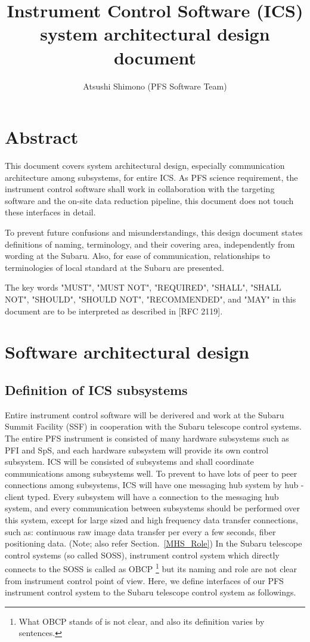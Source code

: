 \documentclass[a4paper,notitlepage]{article}
\title{Instrument Control Software (ICS) system architectural design document}
\author{Atsushi Shimono (PFS Software Team)}
\begin{document}
\ICDITSIDS{}  %
\ICDApproval{}
\ICDSuperApproval{}
\ICDReference{}
\ICDAttachment{}
\icdhead

\section{Abstract}

This document covers system architectural design, especially communication 
architecture among subsystems, for entire ICS. 
As PFS science requirement, the instrument control software shall work 
in collaboration with the targeting software and the on-site data 
reduction pipeline, this document does not touch these interfaces in 
detail.

To prevent future confusions and misunderstandings, 
this design document states definitions of naming, terminology, and 
their covering area, independently from wording at the Subaru.
Also, for ease of communication, relationships to terminologies of local 
standard at the Subaru are presented.

The key words "MUST", "MUST NOT", "REQUIRED", "SHALL", "SHALL NOT", "SHOULD", 
"SHOULD NOT", "RECOMMENDED", and "MAY" in this document are to be interpreted 
as described in [RFC 2119]. 


\section{Software architectural design}

\subsection{Definition of ICS subsystems}

Entire instrument control software will be derivered and work at the 
Subaru Summit Facility (SSF) in cooperation with the Subaru telescope 
control systems.
The entire PFS instrument is consisted of many hardware subsystems 
such as PFI and SpS, and each hardware subsystem will provide its own 
control subsystem. ICS will be consisted of subsystems and shall coordinate 
communications among subsystems well. 
To prevent to have lots of peer to peer connections among subsystems, 
ICS will have one messaging hub system by hub - client typed. 
Every subsystem will have a connection to the messaging hub system, and 
every communication between subsystems should be performed over this system, 
except for large sized and high frequency data transfer connections, such as: 
continuous raw image data transfer per every a few seconds, fiber positioning 
data. 
(Note; also refer Section.~\ref{MHS_Role})
%
In the Subaru telescope control systems (so called SOSS), 
instrument control system which directly connects to the SOSS is called as OBCP
\footnote{What OBCP stands of is not clear, and also its definition varies 
by sentences.} but its naming and role are not clear from instrument 
control point of view.
Here, we define interfaces of our PFS instrument control system to the 
Subaru telescope control system as followings.
\end{document}
